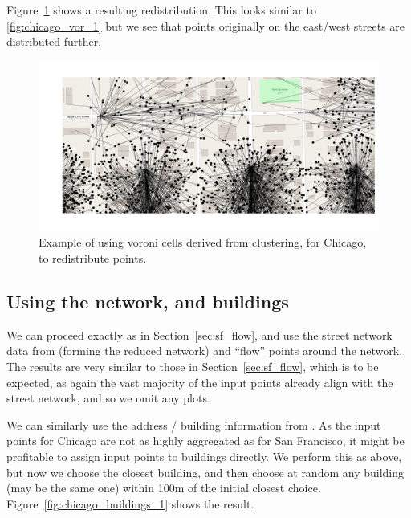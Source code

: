 \documentclass[twoside,a4paper,twocolumn,10pt]{article}
\theoremstyle{plain}
\theoremstyle{definition}
\begin{document}
Figure~\ref{fig:chicago_vor_4} shows a resulting redistribution.  This looks similar to
\ref{fig:chicago_vor_1} but we see that points originally on the east/west streets are
distributed further.

\begin{figure}
  \includegraphics[width=\textwidth]{chicago_redist_cluster.png}
  \caption{Example of using voroni cells derived from clustering, for Chicago, to redistribute points.}
  \label{fig:chicago_vor_4}
\end{figure}


\subsection{Using the network, and buildings}

We can proceed exactly as in Section~\ref{sec:sf_flow}, and use the street network data
from \cite{tiger} (forming the reduced network) and ``flow'' points around the network.
The results are very similar to those in Section~\ref{sec:sf_flow}, which is to be expected,
as again the vast majority of the input points already align with the street network, and
so we omit any plots.

We can similarly use the address / building information from \cite{oa}.  As the input points
for Chicago are not as highly aggregated as for San Francisco, it might be profitable to
assign input points to buildings directly.  We perform this as above, but now we choose the
closest building, and then choose at random any building (may be the same one) within 100m
of the initial closest choice.  Figure~\ref{fig:chicago_buildings_1} shows the result.
\end{document}
